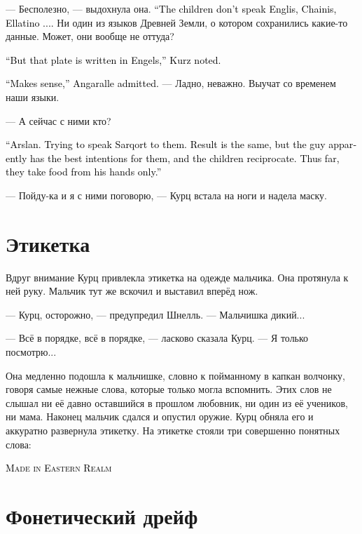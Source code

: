 \documentclass[a4paper,10pt,fleqn]{book}\usepackage{polyglossia}\setdefaultlanguage{english}\setotherlanguage{russian}\defaultfontfeatures{Ligatures=TeX,Mapping=tex-text}\usepackage{xcolor}\definecolor{lightgray}{HTML}{bbbbbb}\color{lightgray}\newcommand{\ml}[3]{\textcolor{black}{#3}}
\begin{document}
--- Бесполезно, --- выдохнула она.
\ml{$0$}
{--- Детишки не понимают англисский, чайнис, эллатино...}
{``The children don't speak Englis, Chainis, Ellatino ....}
Ни один из языков Древней Земли, о котором сохранились какие-то данные.
Может, они вообще не оттуда?

\ml{$0$}
{--- Но табличка-то на ангельском, --- заметила Курц.}
{``But that plate is written in Engels,'' Kurz noted.}

\ml{$0$}
{--- Разумно, --- признала Анкарьяль.}
{``Makes sense,'' Angaralle admitted.}
--- Ладно, неважно.
Выучат со временем наши языки.

--- А сейчас с ними кто?

\ml{$0$}
{--- Арслан.}
{``Arslan.}
\ml{$0$}
{Пытается разговаривать на саркорте.}
{Trying to speak Sarqort to them.}
\ml{$0$}
{Тоже безрезультатно, но у парня явно самые добрые намерения, и дети к нему тянутся.}
{Result is the same, but the guy apparently has the best intentions for them, and the children reciprocate.}
\ml{$0$}
{Едят пока что только из его рук.}
{Thus far, they take food from his hands only.''}

--- Пойду-ка и я с ними поговорю, --- Курц встала на ноги и надела маску.

\section{Этикетка}

Вдруг внимание Курц привлекла этикетка на одежде мальчика.
Она протянула к ней руку.
Мальчик тут же вскочил и выставил вперёд нож.

--- Курц, осторожно, --- предупредил Шнелль.
--- Мальчишка дикий...

--- Всё в порядке, всё в порядке, --- ласково сказала Курц.
--- Я только посмотрю...

Она медленно подошла к мальчишке, словно к пойманному в капкан волчонку, говоря самые нежные слова, которые только могла вспомнить.
Этих слов не слышал ни её давно оставшийся в прошлом любовник, ни один из её учеников, ни мама.
Наконец мальчик сдался и опустил оружие.
Курц обняла его и аккуратно развернула этикетку.
На этикетке стояли три совершенно понятных слова:

\ml{$0$}
{<<Сделано в Восточной Стране>>}
{\textsc{Made in Eastern Realm}}

\section{Фонетический дрейф}
\end{document}

